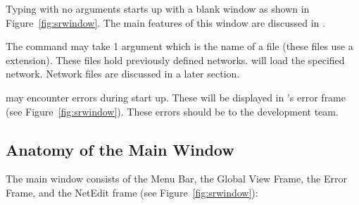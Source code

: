 Typing  with no arguments starts up \sr{} with a blank \sr{}
window as shown in Figure~\ref{fig:srwindow}.  The main features of this
window are discussed in .

The  command may take 1 argument
which is the name of a \sr{}   file (these
files use a  extension).  These files hold previously
defined \sr{} networks.  \sr{} will load the specified network.  Network
files are discussed in a later section.

\sr{} may encounter errors during start up.  These will be displayed in
\sr{}'s error frame (see Figure~\ref{fig:srwindow}).  These errors
should be  to the \sr{} development
team.  

\subsection{Anatomy of the Main Window}
\label{sec:windowanatomy}

The \sr{} main window consists of the Menu Bar, the Global View Frame,
the Error Frame, and the NetEdit frame (see
Figure~\ref{fig:srwindow}):

